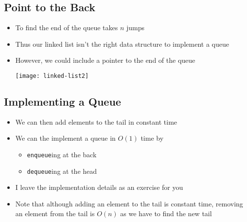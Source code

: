 
\begin{slide}
\section{Point to the Back}

\vspace{-1.5cm}
\begin{PauseHighLight}
  \begin{itemize}
  \item To find the end of the queue takes $n$ jumps\pause
  \item Thus our linked list isn't the right data structure to
    implement a queue\pause
  \item However, we could include a pointer to the end of the queue
    \begin{center}
      \texttt{[image: linked-list2]}\pause
    \end{center}
  \end{itemize}
\end{PauseHighLight}
\end{slide}


\begin{slide}
\section{Implementing a Queue}

\begin{PauseHighLight}
  \begin{itemize}
  \item We can then add elements to the tail in constant time\pause
  \item We can the implement a queue in $O(1)$ time by
    \begin{itemize}
    \item \texttt{enqueue}ing at the back\pause
    \item \texttt{dequeue}ing at the head\pause
    \end{itemize}
  \item I leave the implementation details as an exercise for you\pause
  \item Note that although adding an element to the tail is constant
    time, removing an element from the tail is $O(n)$ as we have to find
    the new tail\pause
  \end{itemize}
\end{PauseHighLight}
\end{slide}

